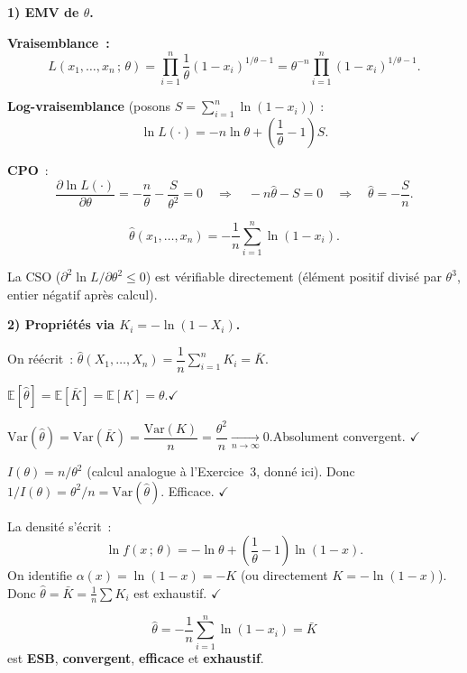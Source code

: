 \documentclass[11pt,a4paper]{article}
\newcommand{\E}{\mathbb{E}}
\newcommand{\Var}{\mathrm{Var}}
\newcommand{\corrsep}{\vspace{4pt}{\color{rulecol}\hrule height 0.6pt}\vspace{6pt}}
\begin{document}
\corrsep

\textbf{1) EMV de $\theta$.}

\textbf{Vraisemblance~:}
$$L(x_1,\ldots,x_n\,;\,\theta)
  = \prod_{i=1}^n \frac{1}{\theta}(1-x_i)^{1/\theta-1}
  = \theta^{-n}\prod_{i=1}^n(1-x_i)^{1/\theta-1}.$$

\textbf{Log-vraisemblance} (posons $S=\sum_{i=1}^n\ln(1-x_i)$)~:
$$\ln L(\cdot) = -n\ln\theta + \left(\frac{1}{\theta}-1\right)S.$$

\textbf{CPO}~:
$$\frac{\partial\ln L(\cdot)}{\partial\theta}
  = -\frac{n}{\theta} - \frac{S}{\theta^2} = 0
  \quad\Longrightarrow\quad -n\hat\theta - S = 0
  \quad\Longrightarrow\quad \hat\theta = -\frac{S}{n}.$$

$$\boxed{\hat\theta(x_1,\ldots,x_n) = -\frac{1}{n}\sum_{i=1}^n\ln(1-x_i).}$$

La CSO ($\partial^2\ln L/\partial\theta^2 \leq 0$) est v\'erifiable directement (\'el\'ement positif divis\'e par $\theta^3$, entier n\'egatif apr\`es calcul).

\medskip
\textbf{2) Propri\'et\'es via $K_i=-\ln(1-X_i)$.}

On r\'e\'ecrit~: $\hat\theta(X_1,\ldots,X_n) = \dfrac{1}{n}\sum_{i=1}^n K_i = \bar K$.

\begin{demobox}
$\E[\hat\theta] = \E[\bar K] = \E[K] = \theta$.\quad$\checkmark$
\end{demobox}

\begin{demobox}[(b) Convergence]
$\Var(\hat\theta) = \Var(\bar K) = \dfrac{\Var(K)}{n} = \dfrac{\theta^2}{n} \xrightarrow[n\to\infty]{} 0$.\quad Absolument convergent. $\checkmark$
\end{demobox}

\begin{demobox}[(c) Efficacit\'e]
$I(\theta) = n/\theta^2$ \quad (calcul analogue \`a l'Exercice~3, donn\'e ici). \quad
Donc $1/I(\theta) = \theta^2/n = \Var(\hat\theta)$. Efficace. $\checkmark$
\end{demobox}

\begin{demobox}[(d) Exhaustivit\'e]
La densit\'e s'\'ecrit~:
$$\ln f(x\,;\,\theta) = -\ln\theta + \left(\frac{1}{\theta}-1\right)\ln(1-x).$$
On identifie $\alpha(x)=\ln(1-x)=-K$ (ou directement $K=-\ln(1-x)$). Donc $\hat\theta=\bar K=\frac{1}{n}\sum K_i$ est exhaustif. $\checkmark$
\end{demobox}

\begin{methbox}
$$\boxed{\hat\theta = -\frac{1}{n}\sum_{i=1}^n\ln(1-x_i) = \bar K}$$
est \textbf{ESB}, \textbf{convergent}, \textbf{efficace} et \textbf{exhaustif}.
\end{methbox}
\end{document}
